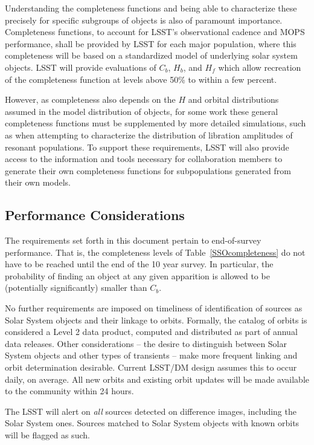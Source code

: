 \documentclass[manuscript]{aastex}
\begin{document}
Understanding the completeness functions and being able to characterize these precisely for specific subgroups of objects is also of paramount importance. Completeness functions, to account for LSST's observational cadence and MOPS performance, shall be provided by LSST for each major population, where this completeness will be based on a standardized model of underlying solar system objects. LSST will provide evaluations of $C_b$, $H_b$, and $H_f$ which allow recreation of the completeness function at levels above 50\% to within a few percent. 

However, as completeness also depends on the $H$ and orbital distributions assumed in the model distribution of objects, for some work these general completeness functions must be supplemented by more detailed simulations, such as when attempting to characterize the distribution of libration amplitudes of resonant populations. To support these requirements, LSST will also provide access to the information and tools necessary for collaboration members to generate their own completeness functions for subpopulations generated from their own models. 

\subsection{Performance Considerations}

The requirements set forth in this document pertain to end-of-survey performance. That is, the completeness levels of Table~\ref{SSOcompleteness} do not have to be reached until the end of the 10 year survey. In particular, the probability of finding an object at any given apparition is allowed to be (potentially significantly) smaller than $C_b$.

No further requirements are imposed on timeliness of identification of sources as Solar System objects and their linkage to orbits. Formally, the catalog of orbits is considered a Level 2 data product, computed and distributed as part of annual data releases. Other considerations -- the desire to distinguish between Solar System objects and other types of transients -- make more frequent linking and orbit determination desirable. Current LSST/DM design assumes this to occur daily, on average. All new orbits and existing orbit updates will be made available to the community within 24 hours.

The LSST will alert on {\em all} sources detected on difference images, including the Solar System ones. Sources matched to Solar System objects with known orbits will be flagged as such.
\end{document}
